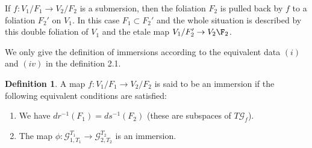 \documentclass[12pt]{amsart}
\theoremstyle{definition}
\newtheorem{defn}[thm]{Definition}
\theoremstyle{remark}
\numberwithin{equation}{section}
\newcommand{\CG}{{\mathcal G}}
\begin{document}
If $f: V_1/F_1 \to V_2/F_2$ is a submersion, then the foliation $F_2$ is pulled back by $f$ to a foliation $F_2'$ on $V_1$. In this case $F_1 \subset F_2'$ and the whole situation is described by this double foliation of $V_1$ and the etale map $V_1/F_2' \to V_2\F_2$.

We only give the definition of immersions according to the equivalent data $(i)$ and $(iv)$ in the definition 2.1.

\begin{defn}
A map $f: V_1/ F_1 \to V_2/F_2$ is said to be an immersion if the following equivalent conditions are satisfied:
\begin{enumerate}
    \item We have $dr^{-1}(F_1) = ds^{-1}(F_2)$ (these are subspaces of $T\CG_f$).
    \item The map $\phi: \CG_{1, T_1}^{T_1} \to \CG_{2, T_2}^{T_2} $ is an immersion.
\end{enumerate}
\end{defn}
\end{document}
